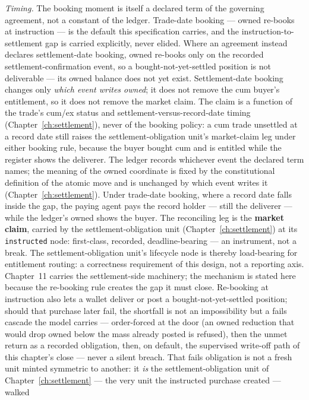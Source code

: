 \documentclass[11pt,a4paper]{article}
\begin{document}
\emph{Timing.} The booking moment is itself a declared term of the governing
agreement, not a constant of the ledger. Trade-date booking --- owned re-books at
instruction --- is the default this specification carries, and the
instruction-to-settlement gap is carried explicitly, never elided. Where an
agreement instead declares settlement-date booking, owned re-books only on the
recorded settlement-confirmation event, so a bought-not-yet-settled position is not
deliverable --- its owned balance does not yet exist. Settlement-date booking changes
only \emph{which event writes owned}; it does not remove the cum buyer's entitlement,
so it does not remove the market claim. The claim is a function of the trade's cum/ex
status and settlement-versus-record-date timing (Chapter~\ref{ch:settlement}), never
of the booking policy: a cum trade unsettled at a record date still raises the
settlement-obligation unit's market-claim leg under either booking rule, because the
buyer bought cum and is entitled while the register shows the deliverer. The ledger
records whichever event the declared term names; the meaning of the owned coordinate
is fixed by the constitutional definition of the atomic move and is unchanged by
which event writes it (Chapter~\ref{ch:settlement}). Under trade-date booking, where a
record date falls inside the gap, the paying agent pays the record holder ---
still the deliverer --- while the ledger's owned shows the buyer. The
reconciling leg is the \textbf{market claim}, carried by the
settlement-obligation unit (Chapter~\ref{ch:settlement}) at its \texttt{instructed}
node: first-class, recorded, deadline-bearing --- an instrument, not a break.
The settlement-obligation unit's lifecycle node is thereby load-bearing for
entitlement routing: a correctness requirement of this design, not a reporting
axis. Chapter~11 carries the settlement-side machinery; the mechanism is stated
here because the re-booking rule creates the gap it must close. Re-booking at instruction
also lets a wallet deliver or post a bought-not-yet-settled position; should
that purchase later fail, the shortfall is not an impossibility but a fails
cascade the model carries --- order-forced at the door (an owned reduction that
would drop owned below the mass already posted is refused), then the unmet
return as a recorded obligation, then, on default, the supervised write-off path
of this chapter's close --- never a silent breach. That fails obligation is not a
fresh unit minted symmetric to another: it \emph{is} the settlement-obligation unit of
Chapter~\ref{ch:settlement} --- the very unit the instructed purchase created --- walked
\end{document}
